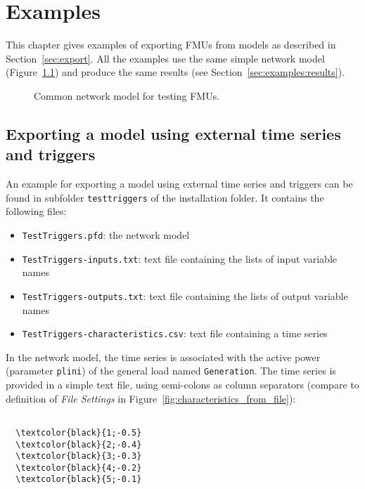 \chapter{Examples}
\label{sec:examples}

This chapter gives examples of exporting FMUs from \pf models as described in Section~\ref{sec:export}.
All the examples use the same simple network model (Figure~\ref{fig:test_model}) and produce the same results (see Section~\ref{sec:examples:results}).

\begin{figure}[h!]
\vspace*{2em}
\caption{Common network model for testing FMUs.}
\label{fig:test_model}
\end{figure}


\section{Exporting a model using external time series and triggers}
\label{sec:examples:triggers}

An example for exporting a model using external time series and triggers can be found in subfolder \texttt{testtriggers} of the installation folder.
It contains the following files:
\begin{itemize}
  \item \texttt{TestTriggers.pfd}: the \pf network model
  \item \texttt{TestTriggers-inputs.txt}: text file containing the lists of input variable names
  \item \texttt{TestTriggers-outputs.txt}: text file containing the lists of output variable names
  \item \texttt{TestTriggers-characteristics.csv}: text file containing a time series
\end{itemize}
In the network model, the time series is associated with the active power (parameter \texttt{plini}) of the general load named \texttt{Generation}. The time series is provided in a simple text file, using semi-colons as column separators (compare to definition of \emph{File Settings} in Figure~\ref{fig:characteristics_from_file}):
\begin{Verbatim}[frame=single,commandchars=\\\{\}]

  \textcolor{black}{1;-0.5}
  \textcolor{black}{2;-0.4}
  \textcolor{black}{3;-0.3}
  \textcolor{black}{4;-0.2}
  \textcolor{black}{5;-0.1}

\end{Verbatim}


